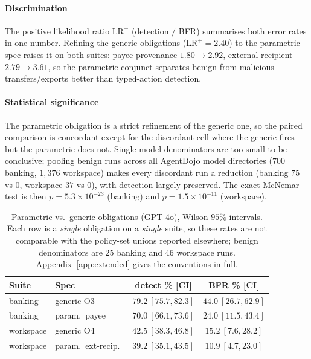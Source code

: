 \documentclass[sigconf]{acmart}
\begin{document}
\paragraph{Discrimination} The positive likelihood ratio $\mathrm{LR^+}$
(detection $/$ BFR) summarises both error rates in one number. Refining the generic
obligations ($\mathrm{LR^+}=2.40$) to the parametric spec raises it on both suites:
payee provenance $1.80\!\to\!2.92$, external recipient $2.79\!\to\!3.61$, so the
parametric conjunct separates benign from malicious transfers/exports better than
typed-action detection.

\paragraph{Statistical significance} The parametric obligation is a strict refinement
of the generic one, so the paired comparison is concordant except for the discordant
cell where the generic fires but the parametric does not. Single-model denominators
are too small to be conclusive; pooling benign runs across all AgentDojo model
directories ($700$ banking, $1{,}376$ workspace) makes every discordant run a
reduction (banking $75$ vs $0$, workspace $37$ vs $0$), with detection largely
preserved. The exact McNemar test is then $p=5.3\times10^{-23}$ (banking) and
$p=1.5\times10^{-11}$ (workspace).

\begin{table}[t]
\centering
\caption{Parametric vs.\ generic obligations (GPT-4o), Wilson $95\%$ intervals. Each row
is a \emph{single} obligation on a \emph{single} suite, so these rates are not comparable
with the policy-set unions reported elsewhere; benign denominators are $25$ banking and
$46$ workspace runs. Appendix~\ref{app:extended} gives the conventions in full.}
\label{tab:param}
\renewcommand{\arraystretch}{1.15}
\setlength{\tabcolsep}{4pt}
\footnotesize
\begin{tabular}{llcc}
\toprule
Suite & Spec & detect \% [CI] & BFR \% [CI] \\
\midrule
banking   & generic O3          & $79.2\ [75.7,82.3]$ & $44.0\ [26.7,62.9]$ \\
banking   & param.\ payee       & $70.0\ [66.1,73.6]$ & $24.0\ [11.5,43.4]$ \\
workspace & generic O4          & $42.5\ [38.3,46.8]$ & $15.2\ [7.6,28.2]$  \\
workspace & param.\ ext-recip.\ & $39.2\ [35.1,43.5]$ & $10.9\ [4.7,23.0]$  \\
\bottomrule
\end{tabular}
\end{table}
\end{document}

